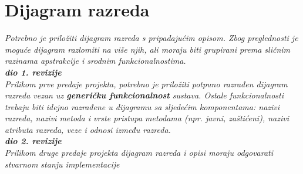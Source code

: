 			\eject
			
			
		\section{Dijagram razreda}
		
			\textit{Potrebno je priložiti dijagram razreda s pripadajućim opisom. Zbog preglednosti je moguće dijagram razlomiti na više njih, ali moraju biti grupirani prema sličnim razinama apstrakcije i srodnim funkcionalnostima.}\\
			
			\textbf{\textit{dio 1. revizije}}\\
			
			\textit{Prilikom prve predaje projekta, potrebno je priložiti potpuno razrađen dijagram razreda vezan uz \textbf{generičku funkcionalnost} sustava. Ostale funkcionalnosti trebaju biti idejno razrađene u dijagramu sa sljedećim komponentama: nazivi razreda, nazivi metoda i vrste pristupa metodama (npr. javni, zaštićeni), nazivi atributa razreda, veze i odnosi između razreda.}\\
			
			\textbf{\textit{dio 2. revizije}}\\			
			
			\textit{Prilikom druge predaje projekta dijagram razreda i opisi moraju odgovarati stvarnom stanju implementacije}
			
			
			
			\eject
		
			
			
			
			
		
			
			
		
		

